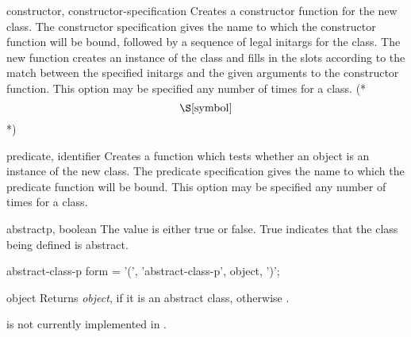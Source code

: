 \begin{optDefinition}
\begin{options}
    \item[constructor, constructor-specification]%
    Creates a constructor function for the new class.  The constructor
    specification gives the name to which the constructor function will be
    bound, followed by a sequence of legal initargs for the class.  The new
    function creates an instance of the class and fills in the slots according
    to the match between the specified initargs and the given arguments to the
    constructor function.  This option may be specified any number of times for
    a class.
    (* \[\S\ref{symbol}\] *)
    \item[predicate, identifier]%
    Creates a function which tests whether an object is an instance of the new
    class.  The predicate specification gives the name to which the predicate
    function will be bound.  This option may be specified any number of times
    for a class.

    \item[abstractp, boolean]%
    The value is either true or false. True indicates that the class being
    defined is abstract.
%
\end{options}
%
\end{optDefinition}
%
%
\savesyntax\abstractClassPSyntax\vbox{\syntax
abstract-class-p form
   = '(', 'abstract-class-p', object, ')';
\endsyntax}
%
\begin{arguments}
    \item[object] Returns {\em object\/}, if it is an abstract class, otherwise
    \nil{}.
\end{arguments}
%
\begin{note}
     is not currently implemented in \youtoo.
\end{note}
%
